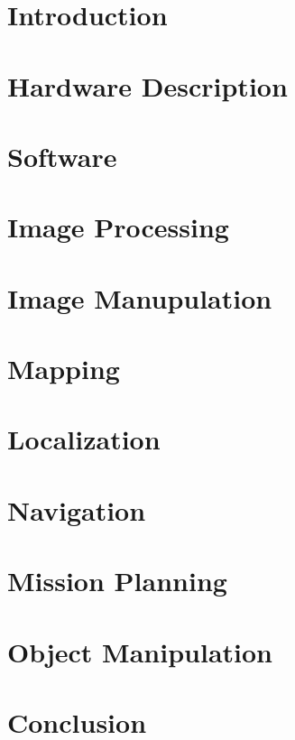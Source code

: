 \documentclass[runningheads,a4paper]{llncs}
\begin{document}
\section{Introduction}


\section{Hardware Description}


\section{Software}


\section{Image Processing}


\section{Image Manupulation}


\section{Mapping}
\label{sec:slam}


\section{Localization}


\section{Navigation}


\section{Mission Planning}


\section{Object Manipulation}


\section{Conclusion}

\end{document}
